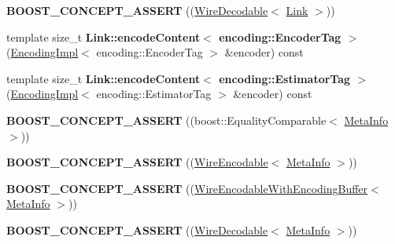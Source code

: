 \begin{DoxyCompactItemize}
\item 
{\bfseries B\+O\+O\+S\+T\+\_\+\+C\+O\+N\+C\+E\+P\+T\+\_\+\+A\+S\+S\+E\+RT} ((\hyperlink{classndn_1_1WireDecodable}{Wire\+Decodable}$<$ \hyperlink{classndn_1_1Link}{Link} $>$))\hypertarget{namespacendn_abcfc79654cb3d76e9926efd1d5dce568}{}\label{namespacendn_abcfc79654cb3d76e9926efd1d5dce568}

\item 
template size\+\_\+t {\bfseries Link\+::encode\+Content$<$ encoding\+::\+Encoder\+Tag $>$} (\hyperlink{classndn_1_1encoding_1_1EncodingImpl}{Encoding\+Impl}$<$ encoding\+::\+Encoder\+Tag $>$ \&encoder) const\hypertarget{namespacendn_acd19efa0ffb28793203c795e42b9d943}{}\label{namespacendn_acd19efa0ffb28793203c795e42b9d943}

\item 
template size\+\_\+t {\bfseries Link\+::encode\+Content$<$ encoding\+::\+Estimator\+Tag $>$} (\hyperlink{classndn_1_1encoding_1_1EncodingImpl}{Encoding\+Impl}$<$ encoding\+::\+Estimator\+Tag $>$ \&encoder) const\hypertarget{namespacendn_a673411eb622c9f915a0e81de2b2f7d85}{}\label{namespacendn_a673411eb622c9f915a0e81de2b2f7d85}

\item 
{\bfseries B\+O\+O\+S\+T\+\_\+\+C\+O\+N\+C\+E\+P\+T\+\_\+\+A\+S\+S\+E\+RT} ((boost\+::\+Equality\+Comparable$<$ \hyperlink{classndn_1_1MetaInfo}{Meta\+Info} $>$))\hypertarget{namespacendn_add0f7e606d504fb481082c72ed700189}{}\label{namespacendn_add0f7e606d504fb481082c72ed700189}

\item 
{\bfseries B\+O\+O\+S\+T\+\_\+\+C\+O\+N\+C\+E\+P\+T\+\_\+\+A\+S\+S\+E\+RT} ((\hyperlink{classndn_1_1WireEncodable}{Wire\+Encodable}$<$ \hyperlink{classndn_1_1MetaInfo}{Meta\+Info} $>$))\hypertarget{namespacendn_a918b28676a57dd2b41f6bf2da6308509}{}\label{namespacendn_a918b28676a57dd2b41f6bf2da6308509}

\item 
{\bfseries B\+O\+O\+S\+T\+\_\+\+C\+O\+N\+C\+E\+P\+T\+\_\+\+A\+S\+S\+E\+RT} ((\hyperlink{classndn_1_1WireEncodableWithEncodingBuffer}{Wire\+Encodable\+With\+Encoding\+Buffer}$<$ \hyperlink{classndn_1_1MetaInfo}{Meta\+Info} $>$))\hypertarget{namespacendn_acfe09562754c05103e05332131d9732a}{}\label{namespacendn_acfe09562754c05103e05332131d9732a}

\item 
{\bfseries B\+O\+O\+S\+T\+\_\+\+C\+O\+N\+C\+E\+P\+T\+\_\+\+A\+S\+S\+E\+RT} ((\hyperlink{classndn_1_1WireDecodable}{Wire\+Decodable}$<$ \hyperlink{classndn_1_1MetaInfo}{Meta\+Info} $>$))\hypertarget{namespacendn_aba8e4ae25730862420a9ff1bebb78bf7}{}\label{namespacendn_aba8e4ae25730862420a9ff1bebb78bf7}


\end{DoxyCompactItemize}
